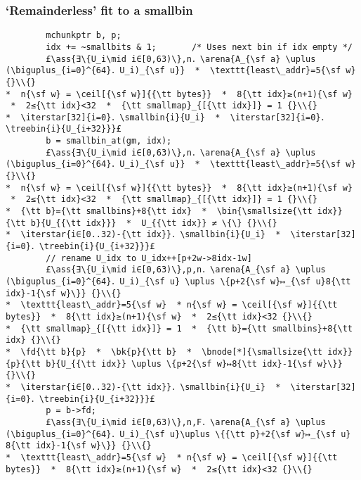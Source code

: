 \documentclass[10pt,twoside]{report}
\makeatletter
\newcommand{\ml}[2][t]{\mbox{\mdseries\begin{tabular}[#1]{@{}L@{}}#2\end{tabular}}}
\newcommand{\ass}[1]{\ensuremath{{\color{blue}\left\{\ml[c]{#1}\right\}}}}
\renewcommand{\ceil}[2][]{\left\lceil{#2}\right\rceil_{#1}}
\newcommand{\iterstar}[2][]{\text{\LARGE $*$}^{#1}_{#2}}
\makeatother
\begin{document}
\subsubsection*{`Remainderless' fit to a smallbin}\label{sect:remainderless_fit_to_a_smallbin}
\begin{lstlisting}
        mchunkptr b, p;
        idx += ~smallbits & 1;       /* Uses next bin if idx empty */
        £\ass{∃\{U_i\mid i∈[0,63)\},n．\arena{A_{\sf a} \uplus (\biguplus_{i=0}^{64}．U_i)_{\sf u}}  *  \texttt{least\_addr}=5{\sf w} {}\\{}
*  n{\sf w} = \ceil[{\sf w}]{{\tt bytes}}  *  8{\tt idx}≥(n+1){\sf w}  *  2≤{\tt idx}<32  *  {\tt smallmap}_{[{\tt idx}]} = 1 {}\\{}
*  \iterstar[32]{i=0}．\smallbin{i}{U_i}  *  \iterstar[32]{i=0}．\treebin{i}{U_{i+32}}}£     
        b = smallbin_at(gm, idx);
        £\ass{∃\{U_i\mid i∈[0,63)\},n．\arena{A_{\sf a} \uplus (\biguplus_{i=0}^{64}．U_i)_{\sf u}}  *  \texttt{least\_addr}=5{\sf w} {}\\{}
*  n{\sf w} = \ceil[{\sf w}]{{\tt bytes}}  *  8{\tt idx}≥(n+1){\sf w}  *  2≤{\tt idx}<32  *  {\tt smallmap}_{[{\tt idx}]} = 1 {}\\{}
*  {\tt b}={\tt smallbins}+8{\tt idx}  *  \bin{\smallsize{\tt idx}}{\tt b}{U_{{\tt idx}}}  *  U_{{\tt idx}} ≠ \{\} {}\\{}
*  \iterstar{i∈[0..32)-{\tt idx}}．\smallbin{i}{U_i}  *  \iterstar[32]{i=0}．\treebin{i}{U_{i+32}}}£ 
        // rename U_idx to U_idx++[p+2w->8idx-1w]
        £\ass{∃\{U_i\mid i∈[0,63)\},p,n．\arena{A_{\sf a} \uplus (\biguplus_{i=0}^{64}．U_i)_{\sf u} \uplus \{p+2{\sf w}↦_{\sf u}8{\tt idx}-1{\sf w}\}} {}\\{}
*  \texttt{least\_addr}=5{\sf w}  * n{\sf w} = \ceil[{\sf w}]{{\tt bytes}}  *  8{\tt idx}≥(n+1){\sf w}  *  2≤{\tt idx}<32 {}\\{}
*  {\tt smallmap}_{[{\tt idx}]} = 1  *  {\tt b}={\tt smallbins}+8{\tt idx} {}\\{}
*  \fd{\tt b}{p}  *  \bk{p}{\tt b}  *  \bnode[*]{\smallsize{\tt idx}}{p}{\tt b}{U_{{\tt idx}} \uplus \{p+2{\sf w}↦8{\tt idx}-1{\sf w}\}} {}\\{}
*  \iterstar{i∈[0..32)-{\tt idx}}．\smallbin{i}{U_i}  *  \iterstar[32]{i=0}．\treebin{i}{U_{i+32}}}£ 
        p = b->fd;
        £\ass{∃\{U_i\mid i∈[0,63)\},n,F．\arena{A_{\sf a} \uplus (\biguplus_{i=0}^{64}．U_i)_{\sf u}\uplus \{{\tt p}+2{\sf w}↦_{\sf u} 8{\tt idx}-1{\sf w}\}} {}\\{} 
*  \texttt{least\_addr}=5{\sf w}  * n{\sf w} = \ceil[{\sf w}]{{\tt bytes}}  *  8{\tt idx}≥(n+1){\sf w}  *  2≤{\tt idx}<32 {}\\{}

\end{lstlisting}
\end{document}
